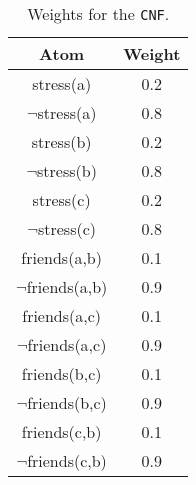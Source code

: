\begin{table}[h]
\centering
\begin{tabular}{c|c}
Atom & Weight \\
\hline
stress(a) & 0.2 \\
$\lnot$stress(a) & 0.8 \\
stress(b) & 0.2 \\
$\lnot$stress(b) & 0.8 \\
stress(c) & 0.2 \\
$\lnot$stress(c) & 0.8 \\
friends(a,b) & 0.1 \\
$\lnot$friends(a,b) & 0.9 \\
friends(a,c) & 0.1 \\
$\lnot$friends(a,c) & 0.9 \\
friends(b,c) & 0.1 \\
$\lnot$friends(b,c) & 0.9 \\
friends(c,b) & 0.1 \\
$\lnot$friends(c,b) & 0.9 \\
\end{tabular}
\caption{Weights for the \texttt{CNF}.}
\label{tab:wcnf}
\end{table}











